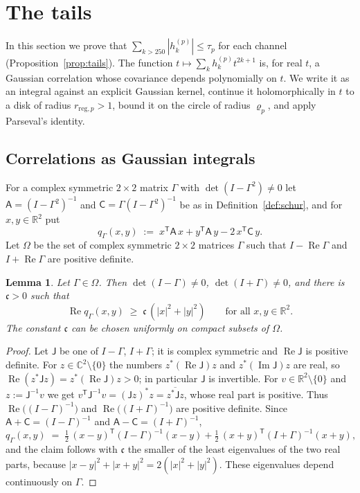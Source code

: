 \documentclass[11pt,reqno]{amsart}
\newtheorem{lemma}[theorem]{Lemma}
\theoremstyle{definition}
\numberwithin{equation}{section}
\newcommand{\C}{\mathbb{C}}
\newcommand{\R}{\mathbb{R}}
\newcommand{\Om}{\Omega}
\newcommand{\sA}{\mathsf{A}}
\newcommand{\sC}{\mathsf{C}}
\DeclareMathOperator{\RePart}{Re}
\DeclareMathOperator{\ImPart}{Im}
\begin{document}
\section{The tails}\label{sec:tails}

In this section we prove that $\sum_{k>250}|h^{(p)}_k|\le\tau_p$ for each channel (Proposition~\ref{prop:tails}). The function $t\mapsto\sum_kh^{(p)}_kt^{2k+1}$ is, for real $t$, a Gaussian correlation whose covariance depends polynomially on $t$. We write it as an integral against an explicit Gaussian kernel, continue it holomorphically in $t$ to a disk of radius $r_{\mathrm{reg},p}>1$, bound it on the circle of radius $\varrho_p$, and apply Parseval's identity.

\subsection{Correlations as Gaussian integrals}
For a complex symmetric $2\times2$ matrix $\Gamma$ with $\det(I-\Gamma^2)\ne0$ let $\sA=(I-\Gamma^2)^{-1}$ and $\sC=\Gamma(I-\Gamma^2)^{-1}$ be as in Definition~\ref{def:schur}, and for $x,y\in\R^2$ put
\[
  q_\Gamma(x,y)\;:=\;x^{\mathsf{T}}\sA\,x+y^{\mathsf{T}}\sA\,y-2\,x^{\mathsf{T}}\sC\,y .
\]
Let $\Om$ be the set of complex symmetric $2\times2$ matrices $\Gamma$ such that $I-\RePart\Gamma$ and $I+\RePart\Gamma$ are positive definite.

\begin{lemma}\label{lem:kerpos}
Let $\Gamma\in\Om$. Then $\det(I-\Gamma)\ne0$, $\det(I+\Gamma)\ne0$, and there is $\mathfrak{c}>0$ such that
\[
  \RePart q_\Gamma(x,y)\;\ge\;\mathfrak{c}\,(|x|^2+|y|^2)\qquad\text{for all }x,y\in\R^2 .
\]
The constant $\mathfrak{c}$ can be chosen uniformly on compact subsets of $\Om$.
\end{lemma}

\begin{proof}
Let $\mathsf{J}$ be one of $I-\Gamma$, $I+\Gamma$; it is complex symmetric and $\RePart \mathsf{J}$ is positive definite. For $z\in\C^2\setminus\{0\}$ the numbers $z^*(\RePart \mathsf{J})z$ and $z^*(\ImPart \mathsf{J})z$ are real, so $\RePart(z^*\mathsf{J}z)=z^*(\RePart \mathsf{J})z>0$; in particular $\mathsf{J}$ is invertible. For $v\in\R^2\setminus\{0\}$ and $z:=\mathsf{J}^{-1}v$ we get $v^{\mathsf{T}}\mathsf{J}^{-1}v=(\mathsf{J}z)^*z=\overline{z^*\mathsf{J}z}$, whose real part is positive. Thus $\RePart\bigl((I-\Gamma)^{-1}\bigr)$ and $\RePart\bigl((I+\Gamma)^{-1}\bigr)$ are positive definite. Since $\sA+\sC=(I-\Gamma)^{-1}$ and $\sA-\sC=(I+\Gamma)^{-1}$,
\begin{equation}\label{eq:q-split}
  q_\Gamma(x,y)\;=\;\tfrac12\,(x-y)^{\mathsf{T}}(I-\Gamma)^{-1}(x-y)+\tfrac12\,(x+y)^{\mathsf{T}}(I+\Gamma)^{-1}(x+y),
\end{equation}
and the claim follows with $\mathfrak{c}$ the smaller of the least eigenvalues of the two real parts, because $|x-y|^2+|x+y|^2=2(|x|^2+|y|^2)$. These eigenvalues depend continuously on $\Gamma$.
\end{proof}
\end{document}
